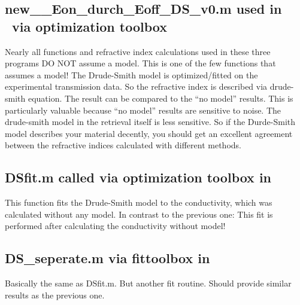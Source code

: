 \documentclass[12pt]{article}
\begin{document}
\subsection{new\_\_Eon\_durch\_Eoff\_DS\_v0.m used in \TRTS~via optimization toolbox}
Nearly all functions and refractive index calculations used in these three programs DO NOT assume a model. This is one of the few functions that assumes a model! The Drude-Smith model is optimized/fitted on the experimental transmission data. So the refractive index is described via drude-smith equation. The result can be compared to the "`no model"' results. This is particularly valuable because "`no model"' results are sensitive to noise. The drude-smith model in the retrieval itself is less sensitive. So if the Durde-Smith model describes your material decently, you should get an excellent agreement between the refractive indices calculated with different methods. 
\subsection{DSfit.m called via optimization toolbox in \TRTS}
This function fits the Drude-Smith model to the conductivity, which was calculated without any model. In contrast to the previous one: This fit is performed after calculating the conductivity without model! 


\subsection{DS\_seperate.m via fittoolbox in \TRTS}
Basically the same as DSfit.m. But another fit routine. Should provide similar results as the previous one. 























		

\end{document}
